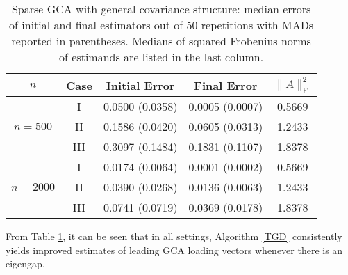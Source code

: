 \documentclass[11pt]{article}
\newcommand{\0}{{\mathbf{0}}}
\begin{document}
\begin{table}[h!]
\centering
\begin{tabular}{c|c|c|c|c}
\hline%
$n$ & Case & Initial Error  & Final Error & $\|A\|_\mathrm{F}^2$ \\ \hline
\multirow{3}{*}{$n=500$} & I & 0.0500 (0.0358)   & 0.0005 (0.0007) & 0.5669 
\\ \cline{2-5} 
 & II & 0.1586 (0.0420) &   0.0605 (0.0313)&  1.2433 
 \\ \cline{2-5} 
  & III &  0.3097  (0.1484) &    0.1831 (0.1107) & 1.8378 
  \\ \hline%
\multirow{3}{*}{$n=2000$} & I &  0.0174  (0.0064)   & 0.0001 (0.0002)&  0.5669 
\\ \cline{2-5} 
 & II & 0.0390 (0.0268)   & 0.0136 (0.0063)&  1.2433 
 \\ \cline{2-5} 
   & III & 0.0741 (0.0719) &   0.0369 (0.0178)&  1.8378 
   \\ \hline%
\end{tabular}
\caption{ Sparse GCA with general covariance structure: median errors of initial and final estimators out of $50$ repetitions with MADs reported in parentheses. Medians of squared Frobenius norms of estimands are listed in the last column.}


\label{table:sgca_general_covariance}
\end{table}
From Table \ref{table:sgca_general_covariance}, it can be seen that in all settings, Algorithm \ref{TGD} consistently yields improved estimates of leading GCA loading vectors whenever there is an eigengap. 



\iffalse
\end{document}
